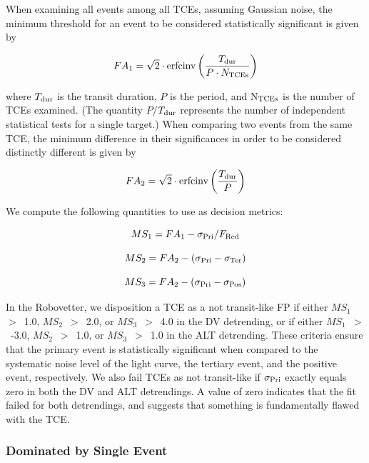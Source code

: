 When examining all events among all TCEs, assuming Gaussian noise, the minimum threshold for an event to be considered statistically significant is given by

\begin{equation}
    FA_{1} = \sqrt{2}\cdot \textrm{erfcinv}\left(\frac{T_{\rm dur}}{P \cdot N_{\rm TCEs}}\right)
\end{equation}

\noindent where $T_{\rm dur}$ is the transit duration, $P$ is the period, and N$_{\rm TCEs}$ is the number of TCEs examined. (The quantity $P$/$T_{\rm dur}$ represents the number of independent statistical tests for a single target.) When comparing two events from the same TCE, the minimum difference in their significances in order to be considered distinctly different is given by

\begin{equation}
    FA_{2} = \sqrt{2}\cdot \textrm{erfcinv}\left(\frac{T_{\rm dur}}{P}\right)
\end{equation}

\noindent We compute the following quantities to use as decision metrics:

\begin{equation}
    MS_{1} = FA_{1} - \sigma_{\rm Pri}/F_{\rm Red}
\end{equation}

\begin{equation}
    MS_{2} = FA_{2} - (\sigma_{\rm Pri} - \sigma_{\rm Ter})
\end{equation}

\begin{equation}
    MS_{3} = FA_{2} - (\sigma_{\rm Pri} - \sigma_{\rm Pos})
\end{equation}

In the Robovetter, we disposition a TCE as a not transit-like FP if either $MS_{1}$~$>$~1.0, $MS_{2}$~$>$~2.0, or $MS_{3}$~$>$~4.0 in the DV detrending, or if either $MS_{1}$~$>$~-3.0, $MS_{2}$~$>$~1.0, or $MS_{3}$~$>$~1.0 in the ALT detrending. These criteria ensure that the primary event is statistically significant when compared to the systematic noise level of the light curve, the tertiary event, and the positive event, respectively. We also fail TCEs as not transit-like if $\sigma_{\rm Pri}$ exactly equals zero in both the DV and ALT detrendings. A value of zero indicates that the fit failed for both detrendings, and suggests that something is fundamentally flawed with the TCE.


\subsubsection{Dominated by Single Event}
\label{s:sesmes}

